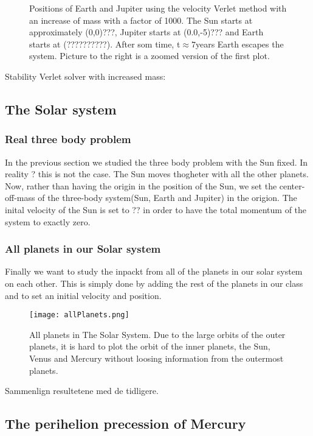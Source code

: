 \documentclass[../main.tex]{subfiles}
\begin{document}
\begin{figure}[!h]
  \centering
  \caption{Positions of Earth and Jupiter using the velocity Verlet method with an increase of mass with a factor of 1000. The Sun starts at approximately (0,0)???, Jupiter starts at (0.0,-5)??? and Earth starts at (??????????). After som time, t$\approx 7$years Earth escapes the system. Picture to the right is a zoomed version of the first plot.}
  \label{fig:SunEarthJupiter10000}
\end{figure}

Stability Verlet solver with increased mass:



\subsection{The Solar system}
\subsubsection{Real three body problem}

In the previous section we studied the three body problem with the Sun fixed. In reality ? this is not the case. The Sun moves thogheter with all the other planets. Now, rather than having the origin in the position of the Sun, we set the center-off-mass of the three-body system(Sun, Earth and Jupiter) in the origion. The inital velocity of the Sun is set to ?? in order to have the total momentum of the system to exactly zero.


\subsubsection{All planets in our Solar system}
Finally we want to study the inpackt from all of the planets in our solar system on each other. This is simply done by adding the rest of the planets in our class and to set an initial velocity and position.  

\begin{figure}[!h]
  \texttt{[image: allPlanets.png]}
  \caption{All planets in The Solar System. Due to the large orbits of the outer planets, it is hard to plot the orbit of the inner planets, the Sun, Venus and Mercury without loosing information from the outermost planets.}
  \label{fig:allPlanets}
\end{figure}


Sammenlign resultetene med de tidligere.

\subsection{The perihelion precession of Mercury}
\end{document}
